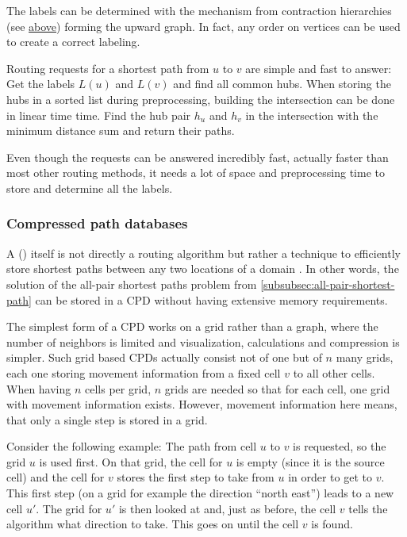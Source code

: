 			The labels can be determined with the mechanism from contraction hierarchies (see \hyperref[subsubsec:ch]{above}) forming the upward graph.
			In fact, any order on vertices can be used to create a correct labeling.

			Routing requests for a shortest path from $u$ to $v$ are simple and fast to answer:
			Get the labels $L(u)$ and $L(v)$ and find all common hubs.
			When storing the hubs in a sorted list during preprocessing, building the intersection can be done in linear time time.
			Find the hub pair $h_u$ and $h_v$ in the intersection with the minimum distance sum and return their paths.
			
			Even though the requests can be answered incredibly fast, actually faster than most other routing methods, it needs a lot of space and preprocessing time to store and determine all the labels.
		
		\subsubsection{Compressed path databases}
		\label{subsubsec:cpd}
		
			A  () itself is not directly a routing algorithm but rather a technique to efficiently store shortest paths between any two locations of a domain \cite{botea-cpd-2013}.
			In other words, the solution of the all-pair shortest paths problem from \cref{subsubsec:all-pair-shortest-path} can be stored in a CPD without having extensive memory requirements.
			
			The simplest form of a CPD works on a grid rather than a graph, where the number of neighbors is limited and visualization, calculations and compression is simpler.
			Such grid based CPDs actually consist not of one but of $n$ many grids, each one storing movement information from a fixed cell $v$ to all other cells.
			When having $n$ cells per grid, $n$ grids are needed so that for each cell, one grid with movement information exists.
			However, movement information here means, that only a single step is stored in a grid.
			
			Consider the following example:
			The path from cell $u$ to $v$ is requested, so the grid $u$ is used first.
			On that grid, the cell for $u$ is empty (since it is the source cell) and the cell for $v$ stores the first step to take from $u$ in order to get to $v$.
			This first step (on a grid for example the direction \enquote{north east}) leads to a new cell $u'$.
			The grid for $u'$ is then looked at and, just as before, the cell $v$ tells the algorithm what direction to take.
			This goes on until the cell $v$ is found.
			
